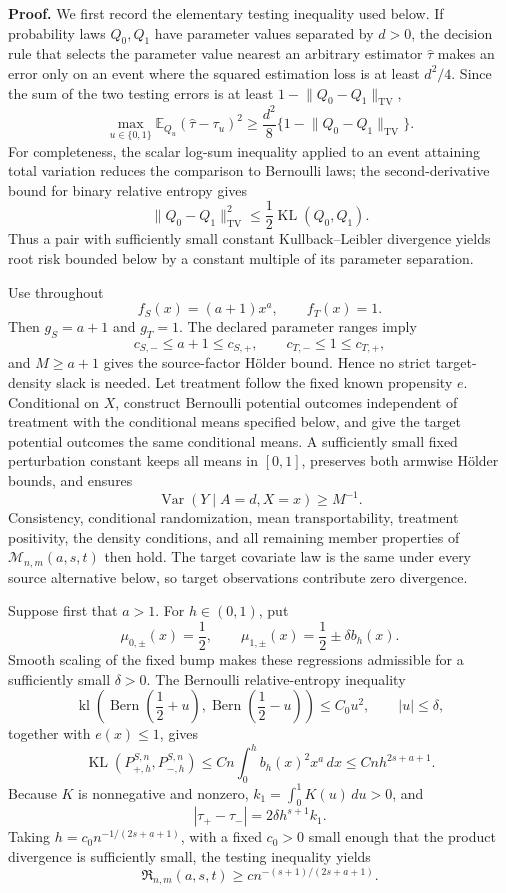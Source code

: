 \textbf{Proof.}
We first record the elementary testing inequality used below. If probability laws \(Q_0,Q_1\) have parameter values separated by \(d>0\), the decision rule that selects the parameter value nearest an arbitrary estimator \(\widehat\tau\) makes an error only on an event where the squared estimation loss is at least \(d^2/4\). Since the sum of the two testing errors is at least \(1-\lVert Q_0-Q_1\rVert_{\mathrm{TV}}\),
\[
\max_{u\in\{0,1\}}\mathbb E_{Q_u}(\widehat\tau-\tau_u)^2
\ge \frac{d^2}{8}\{1-\lVert Q_0-Q_1\rVert_{\mathrm{TV}}\}.
\]
For completeness, the scalar log-sum inequality applied to an event attaining total variation reduces the comparison to Bernoulli laws; the second-derivative bound for binary relative entropy gives
\[
\lVert Q_0-Q_1\rVert_{\mathrm{TV}}^2\le\frac12\operatorname{KL}(Q_0,Q_1).
\]
Thus a pair with sufficiently small constant Kullback--Leibler divergence yields root risk bounded below by a constant multiple of its parameter separation.

Use throughout
\[
f_S(x)=(a+1)x^a,
\qquad
f_T(x)=1.
\]
Then \(g_S=a+1\) and \(g_T=1\). The declared parameter ranges imply
\[
c_{S,-}\le a+1\le c_{S,+},
\qquad
c_{T,-}\le1\le c_{T,+},
\]
and \(M\ge a+1\) gives the source-factor Hölder bound. Hence no strict target-density slack is needed. Let treatment follow the fixed known propensity \(e\). Conditional on \(X\), construct Bernoulli potential outcomes independent of treatment with the conditional means specified below, and give the target potential outcomes the same conditional means. A sufficiently small fixed perturbation constant keeps all means in \([0,1]\), preserves both armwise Hölder bounds, and ensures
\[
\operatorname{Var}(Y\mid A=d,X=x)\ge M^{-1}.
\]
Consistency, conditional randomization, mean transportability, treatment positivity, the density conditions, and all remaining member properties of \(\mathcal M_{n,m}(a,s,t)\) then hold. The target covariate law is the same under every source alternative below, so target observations contribute zero divergence.

Suppose first that \(a>1\). For \(h\in(0,1)\), put
\[
\mu_{0,\pm}(x)=\frac12,
\qquad
\mu_{1,\pm}(x)=\frac12\pm\delta b_h(x).
\]
Smooth scaling of the fixed bump makes these regressions admissible for a sufficiently small \(\delta>0\). The Bernoulli relative-entropy inequality
\[
\operatorname{kl}\!\left(\operatorname{Bern}\left(\frac12+u\right),
\operatorname{Bern}\left(\frac12-u\right)\right)\le C_0u^2,
\qquad |u|\le\delta,
\]
together with \(e(x)\le1\), gives
\[
\operatorname{KL}(P_{+,h}^{S,n},P_{-,h}^{S,n})
\le Cn\int_0^h b_h(x)^2x^a\,dx
\le Cnh^{2s+a+1}.
\]
Because \(K\) is nonnegative and nonzero, \(k_1=\int_0^1K(u)\,du>0\), and
\[
|\tau_+-\tau_-|
=2\delta h^{s+1}k_1.
\]
Taking \(h=c_0n^{-1/(2s+a+1)}\), with a fixed \(c_0>0\) small enough that the product divergence is sufficiently small, the testing inequality yields
\[
\mathfrak R_{n,m}(a,s,t)
\ge c n^{-(s+1)/(2s+a+1)}.
\]

